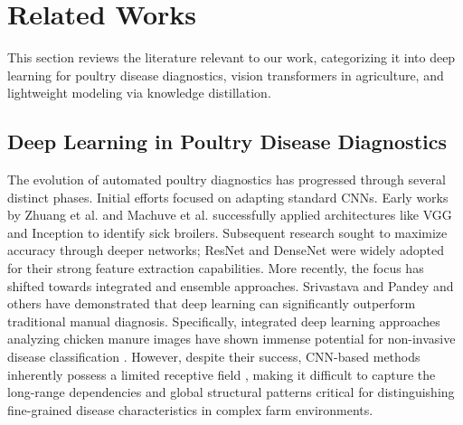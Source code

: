 \documentclass[review]{elsarticle}
\begin{document}
\section{Related Works}

This section reviews the literature relevant to our work, categorizing it into deep learning for poultry disease diagnostics, vision transformers in agriculture, and lightweight modeling via knowledge distillation.

\subsection{Deep Learning in Poultry Disease Diagnostics}
The evolution of automated poultry diagnostics has progressed through several distinct phases.
Initial efforts focused on adapting standard CNNs. Early works by Zhuang et al. \cite{zhuang2019detection} and Machuve et al. \cite{machuve2021machine, machuve2022poultry} successfully applied architectures like VGG \cite{simonyan2014very} and Inception \cite{szegedy2016rethinking} to identify sick broilers.
Subsequent research sought to maximize accuracy through deeper networks; ResNet \cite{he2016deep} and DenseNet \cite{huang2017densely, mbelwa2021deep} were widely adopted for their strong feature extraction capabilities.
More recently, the focus has shifted towards integrated and ensemble approaches.
Srivastava and Pandey \cite{srivastava2025integrated} and others \cite{spie2025deep, ijisrt2024assessment,story2015greenhouse,chen2021plantdisease,montalbo2022coffee} have demonstrated that deep learning can significantly outperform traditional manual diagnosis. Specifically, integrated deep learning approaches analyzing chicken manure images have shown immense potential for non-invasive disease classification \cite{dhungana2025integrated}. However, despite their success, CNN-based methods inherently possess a limited receptive field \cite{liu2021swin, gupta2023review}, making it difficult to capture the long-range dependencies and global structural patterns critical for distinguishing fine-grained disease characteristics in complex farm environments.
\end{document}
